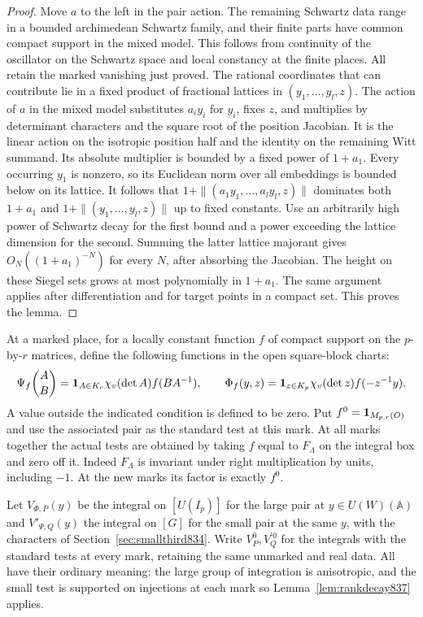 \documentclass[a4paper,11pt]{article}
\theoremstyle{definition}
\theoremstyle{remark}
\numberwithin{equation}{section}
\begin{document}
\begin{proof}
Move \(a\) to the left in the pair action. The remaining
Schwartz data range in a bounded archimedean Schwartz family,
and their finite parts have common compact support in the
mixed model. This follows from continuity of the oscillator
on the Schwartz space and local constancy at the finite
places. All retain the marked vanishing just proved.
The rational coordinates that can contribute lie in a
fixed product of fractional lattices in \((y_1,\ldots,y_l,z)\).
The action of \(a\) in the mixed model substitutes \(a_i y_i\)
for \(y_i\), fixes \(z\), and multiplies by determinant
characters and the square root of the position Jacobian.
It is the linear action on the isotropic position half and
the identity on the remaining Witt summand. Its absolute
multiplier is bounded by a fixed power of \(1+a_1\).
Every occurring \(y_1\) is nonzero, so its Euclidean norm
over all embeddings is bounded below on its lattice.
It follows that
\(1+\|(a_1y_1,\ldots,a_ly_l,z)\|\) dominates both
\(1+a_1\) and \(1+\|(y_1,\ldots,y_l,z)\|\) up to fixed
constants. Use an arbitrarily high power of Schwartz decay
for the first bound and a power exceeding the lattice
dimension for the second. Summing the latter lattice
majorant gives \(O_N((1+a_1)^{-N})\) for every \(N\),
after absorbing the Jacobian. The height on these Siegel
sets grows at most polynomially in \(1+a_1\). The same
argument applies after differentiation and for target points
in a compact set. This proves the lemma.
\end{proof}

At a marked place, for a locally constant function \(f\)
of compact support on the \(p\)-by-\(r\) matrices, define
the following functions in the open square-block charts:
\[
 \Psi_f\binom{A}{B}={\bf1}_{A\in K_r}\chi_v(\det A)f(BA^{-1}),
 \qquad
 \Phi_f(y,z)={\bf1}_{z\in K_p}\chi_v(\det z)f(-z^{-1}y).
\]
A value outside the indicated condition is defined to be
zero. Put \(f^0={\bf1}_{M_{p,r}(O)}\) and use the associated
pair as the standard test at this mark. At all marks together
the actual tests are obtained by taking \(f\) equal to
\(F_\Lambda\) on the integral box and zero off it. Indeed
\(F_\Lambda\) is invariant under right multiplication by
units, including \(-1\). At the new marks its factor is
exactly \(f^0\).

Let \(V_{\Phi,P}(y)\) be the integral on \([U(I_p)]\) for the
large pair at \(y\in U(W)(\mathbb A)\) and
\(V'_{\Psi,Q}(y)\) the integral on \([G]\) for the small
pair at the same \(y\), with the characters of
Section~\ref{sec:smallthird834}. Write \(V^0_P,V^{\prime0}_Q\)
for the integrals with the standard tests at every mark,
retaining the same unmarked and real data. All have their
ordinary meaning: the large group of integration is anisotropic,
and the small test is supported on injections at each mark
so Lemma~\ref{lem:rankdecay837} applies.
\end{document}
